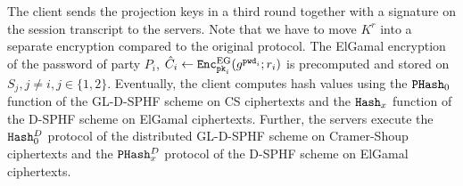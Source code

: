The client sends the projection keys in a third round together with a signature on the session transcript to the servers.
Note that we have to move $K^r$ into a separate encryption compared to the original protocol.
The ElGamal encryption of the password of party $P_i$, $\hat{C}_i\gets\mathtt{Enc}^\mathrm{EG}_{\mathtt{pk}_i}(g^{\mathtt{pwd}_i};r_i)$ is precomputed and stored on $S_{j},j\not=i,j\in\{1,2\}$.
Eventually, the client computes hash values using the $\mathtt{PHash}_0$ function of the GL-\ac{D-SPHF} scheme on CS ciphertexts and the $\mathtt{Hash}_x$ function of the \ac{D-SPHF} scheme on ElGamal ciphertexts.
Further, the servers execute the $\mathtt{Hash}_0^D$ protocol of the distributed GL-\ac{D-SPHF} scheme on Cramer-Shoup ciphertexts and the $\mathtt{PHash}_x^D$ protocol of the \ac{D-SPHF} scheme on ElGamal ciphertexts.


